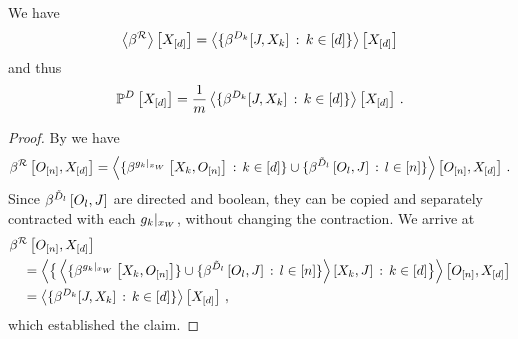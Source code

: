 \begin{theorem}
    \label{the:extractionDataCores}
    We have
    \begin{align*}
        \left\langle \beta^{\mathcal{R}}\right\rangle \left[ X_{[d]} \right]
        = \left\langle \{\beta^{D_{k}}[J,X_{k}] \, : \, k\in[d]\}\right\rangle \left[ X_{[d]} \right]
    \end{align*}
    and thus
    \begin{align*}
        \mathbb{P}^{D}\left[X_{[d]}\right]
        = \frac{1}{m} \left\langle \{\beta^{D_{k}}[J,X_{k}]  \, : \, k\in[d]\}\right\rangle \left[ X_{[d]} \right] \, .
    \end{align*}
\end{theorem}
\begin{proof}
    By  we have
    \begin{align*}
        \beta^{\mathcal{R}}\left[O_{[n]},X_{[d]}\right] =
        \left\langle 
            \{\beta^{{g_{k}}|_{x_{W}}}\left[X_{k},O_{[n]}\right] \, : \, k\in[d]\}
            \cup \{\beta^{\tilde{D}_{l}}\left[O_{l},J\right] \, : \, l\in[n]\}
        \right\rangle \left[ O_{[n]},X_{[d]} \right] \, .
    \end{align*}
    Since $\beta^{\tilde{D}_{l}}\left[O_{l},J\right]$ are directed and boolean, they can be copied and separately contracted with each ${g_{k}}|_{x_{W}}$, without changing the contraction.
    We arrive at
    \begin{align*}
        &\beta^{\mathcal{R}}\left[O_{[n]},X_{[d]}\right] \\
        &\quad = \left\langle 
            \big\{\left\langle 
                \{\beta^{{g_{k}}|_{x_{W}}}\left[X_{k},O_{[n]}\right]\}
                \cup \{\beta^{\tilde{D}_{l}}\left[O_{l},J\right] \, : \, l\in[n]\}
            \right\rangle \left[ X_{k},J \right] \, : \, k\in[d] \big\}
        \right\rangle \left[ O_{[n]},X_{[d]} \right] \\
        & \quad =  \left\langle \{\beta^{D_{k}}[J,X_{k}]  \, : \, k\in[d]\}\right\rangle \left[ X_{[d]} \right] \, ,
    \end{align*}
    which established the claim.
\end{proof}

